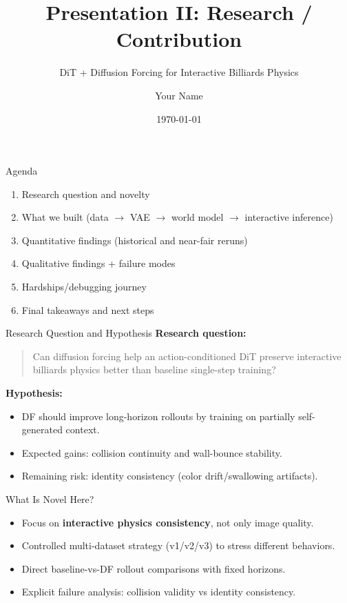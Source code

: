 \documentclass[aspectratio=169,11pt]{beamer}
\title{Presentation II: Research / Contribution}
\subtitle{DiT + Diffusion Forcing for Interactive Billiards Physics}
\author{Your Name}
\date{\today}
\begin{document}
\begin{frame}
  \titlepage
\end{frame}

\begin{frame}{Agenda}
\begin{enumerate}
  \item Research question and novelty
  \item What we built (data \(\rightarrow\) VAE \(\rightarrow\) world model \(\rightarrow\) interactive inference)
  \item Quantitative findings (historical and near-fair reruns)
  \item Qualitative findings + failure modes
  \item Hardships/debugging journey
  \item Final takeaways and next steps
\end{enumerate}
\end{frame}

\begin{frame}{Research Question and Hypothesis}
\textbf{Research question:}
\begin{quote}
Can diffusion forcing help an action-conditioned DiT preserve interactive billiards physics better than baseline single-step training?
\end{quote}
\vspace{0.4em}
\textbf{Hypothesis:}
\begin{itemize}
  \item DF should improve long-horizon rollouts by training on partially self-generated context.
  \item Expected gains: collision continuity and wall-bounce stability.
  \item Remaining risk: identity consistency (color drift/swallowing artifacts).
\end{itemize}
\end{frame}

\begin{frame}{What Is Novel Here?}
\begin{itemize}
  \item Focus on \textbf{interactive physics consistency}, not only image quality.
  \item Controlled multi-dataset strategy (v1/v2/v3) to stress different behaviors.
  \item Direct baseline-vs-DF rollout comparisons with fixed horizons.
  \item Explicit failure analysis: collision validity vs identity consistency.
\end{itemize}
\end{frame}
\end{document}
